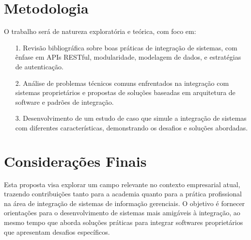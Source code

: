 \documentclass[12pt, a4paper, onecolumn]{exam}
\begin{document}
\section{Metodologia}

O trabalho será de natureza exploratória e teórica, com foco em:
\begin{enumerate}
    \item[1.] Revisão bibliográfica sobre boas práticas de integração de sistemas, com ênfase em APIs RESTful, modularidade, modelagem de dados, e estratégias de autenticação.
    
    \item[2.] Análise de problemas técnicos comuns enfrentados na integração com sistemas proprietários e propostas de soluções baseadas em arquitetura de software e padrões de integração.
    
    \item[3.] Desenvolvimento de um estudo de caso que simule a integração de sistemas com diferentes características, demonstrando os desafios e soluções abordadas.
\end{enumerate}
\section{Considerações Finais}

\sloppy
Esta proposta visa explorar um campo relevante no contexto empresarial atual, trazendo contribuições tanto para a academia quanto para a prática profissional na área de integração de sistemas de informação gerenciais. O objetivo é fornecer orientações para o desenvolvimento de sistemas mais amigáveis à integração, ao mesmo tempo que aborda soluções práticas para integrar softwares proprietários que apresentam desafios específicos.
\end{document}
